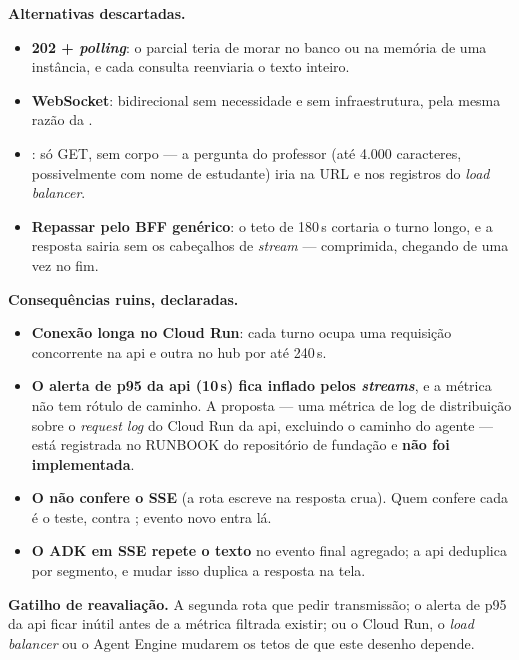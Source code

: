 \textbf{Alternativas descartadas.}

\begin{itemize}
  \item \textbf{202 + \emph{polling}}: o parcial teria de morar no banco ou na
    memória de uma instância, e cada consulta reenviaria o texto inteiro.
  \item \textbf{WebSocket}: bidirecional sem necessidade e sem infraestrutura,
    pela mesma razão da .
  \item \textbf{}: só GET, sem corpo --- a pergunta do professor
    (até 4.000 caracteres, possivelmente com nome de estudante) iria na URL e
    nos registros do \emph{load balancer}.
  \item \textbf{Repassar pelo BFF genérico}: o teto de 180\,s cortaria o turno
    longo, e a resposta sairia sem os cabeçalhos de \emph{stream} --- comprimida,
    chegando de uma vez no fim.
\end{itemize}

\textbf{Consequências ruins, declaradas.}

\begin{itemize}
  \item \textbf{Conexão longa no Cloud Run}: cada turno ocupa uma requisição
    concorrente na api e outra no hub por até 240\,s.
  \item \textbf{O alerta de p95 da api (10\,s) fica inflado pelos
    \emph{streams}}, e a métrica  não
    tem rótulo de caminho. A proposta --- uma métrica de log de distribuição
    sobre o \emph{request log} do Cloud Run da api, excluindo o caminho do
    agente --- está registrada no RUNBOOK do repositório de fundação e
    \textbf{não foi implementada}.
  \item \textbf{O  não confere o SSE} (a rota escreve na
    resposta crua). Quem confere cada  é o teste, contra
    ; evento novo entra lá.
  \item \textbf{O ADK em SSE repete o texto} no evento final agregado; a api
    deduplica por segmento, e mudar isso duplica a resposta na tela.
\end{itemize}

\textbf{Gatilho de reavaliação.} A segunda rota que pedir transmissão; o alerta
de p95 da api ficar inútil antes de a métrica filtrada existir; ou o Cloud Run, o
\emph{load balancer} ou o Agent Engine mudarem os tetos de que este desenho
depende.

